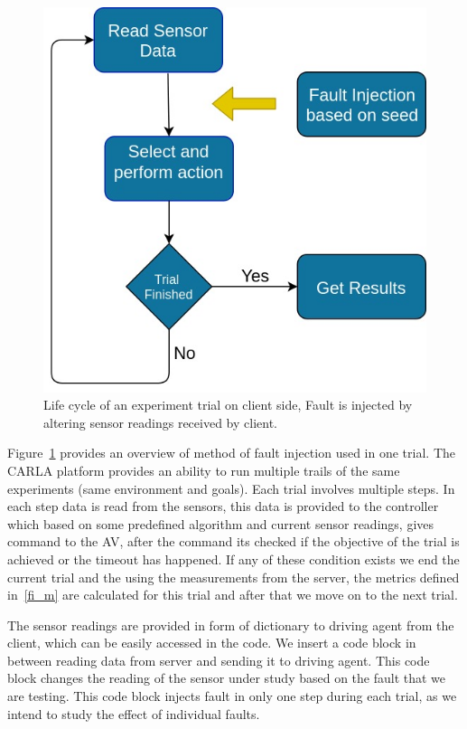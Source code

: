 \begin{figure}  [h]
	\vspace{-0.5em}
	\centering
	\includegraphics[scale=0.3]{FI_method}
	\vspace{-0.5em}
	\caption{Life cycle of an experiment trial on client side, Fault is injected by altering sensor readings received by client.}
	\label{fig:FI_method}
	\vspace{-1.5em}
\end{figure}

Figure~\ref{fig:FI_method} provides an overview of method of fault injection used in one trial. The CARLA platform provides an ability to run multiple trails of the same experiments (same environment and goals). Each trial involves multiple steps. In each step data is read from the sensors, this data is provided to the controller which based on some predefined algorithm and current sensor readings, gives command to the AV, after the command its checked if the objective of the trial is achieved or the timeout has happened. If any of these condition exists we end the current trial and the using the measurements from the server, the metrics defined in~\ref{fi_m} are calculated for this trial and after that we move on to the next trial. 

The sensor readings are provided in form of dictionary to driving agent from the client, which can be easily accessed in the code. We insert a code block in between reading data from server and sending it to driving agent. This code block changes the reading of the sensor under study based on the fault that we are testing. This code block injects fault in only one step during each trial, as we intend to study the effect of individual faults. 

